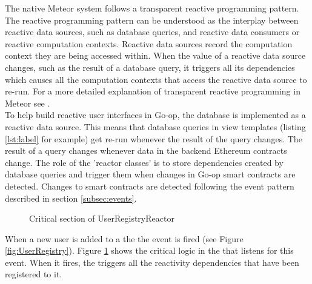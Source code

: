 The native Meteor system follows a transparent reactive programming pattern. The reactive programming pattern can be understood as the interplay between reactive data sources, such as database queries, and reactive data consumers or reactive computation contexts. Reactive data sources record the computation context they are being accessed within. When the value of a reactive data source changes, such as the result of a database query, it triggers all its dependencies which causes all the computation contexts that access the reactive data source to re-run. For a more detailed explanation of transparent reactive programming in Meteor see \cite{Tracker}.\\

To help build reactive user interfaces in Go-op, the database is implemented as a reactive data source. This means that database queries in view templates (listing \ref{lst:label} for example) get re-run whenever the result of the query changes. The result of a query changes whenever data in the backend Ethereum contracts change. The role of the 'reactor classes' is to store dependencies created by database queries and trigger them when changes in Go-op smart contracts are detected. Changes to smart contracts are detected following the event pattern described in section \ref{subsec:events}. \\

\begin{figure}
\centering
{}
\decoRule
\caption[Critical Section In UserRegistryReactor]{Critical section of UserRegistryReactor}
\label{fig:UserRegistryReactor}
\end{figure}

When a new user is added to a the  the  event is fired (see Figure \ref{fig:UserRegistry}). Figure \ref{fig:UserRegistryReactor} shows the critical logic in the  that listens for this event. When it fires, the  triggers all the reactivity dependencies that have been registered to it. \\

